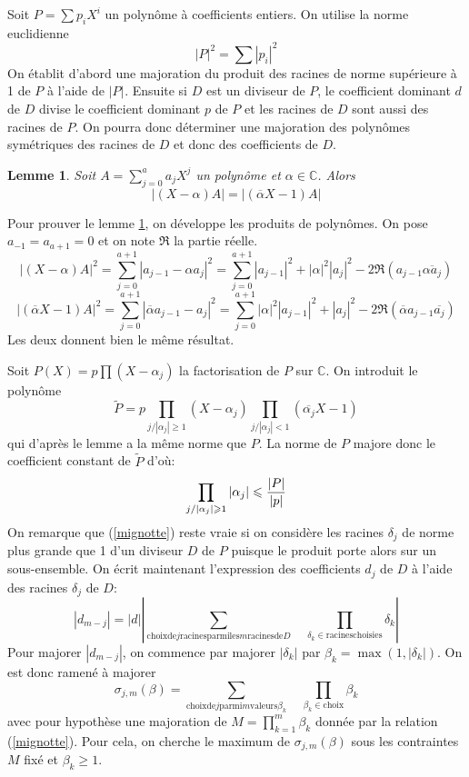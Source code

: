 \documentclass[a4paper,11pt]{article}
\newtheorem{lemma}[thm]{Lemme}
\begin{document}
Soit $P = \sum p_i X^i$ un polynôme à coefficients entiers. On utilise la
norme euclidienne
\begin{equation}
  | P |^2 = \sum | p_i |^2
\end{equation}
On établit d'abord une majoration du produit des racines de norme supérieure à
1 de $P$ à l'aide de $| P |^{}$. Ensuite si $D$ est un diviseur de $P$, le
coefficient dominant $d$ de $D$ divise le coefficient dominant $p$ de $P$ et 
les racines de $D$ sont aussi des racines de $P$. On pourra donc déterminer une
majoration des polynômes symétriques des racines de $D$ et donc des
coefficients de $D$.

\begin{lemma} \label{lemme:A}
  Soit $A = \sum_{j = 0}^a a_j X^j$ un polynôme et $\alpha \in \mathbb{C}$.
  Alors
  \[ \text{$| ( X - \alpha ) A | = | ( \overline{\alpha} X - 1 ) A |$} \]
\end{lemma}

Pour prouver le lemme \ref{lemme:A}, on développe les produits de polynômes. 
On pose $a_{-1} = a_{a + 1} = 0$ et on note $\Re$ la partie réelle.
\[ \text{$| ( X - \alpha ) A |^2 = \sum_{j = 0}^{a + 1}$} | a_{j - 1} - \alpha
   a_j |^2 = \sum_{j = 0}^{a + 1} | a_{j - 1} |^2 + | \alpha |^2 | a_j |^2 - 2
   \Re ( a_{j - 1} \overline{\alpha  a_j} ) \]
\[ \text{$| (  \overline{\alpha} X - 1 ) A |$}^2 = \sum_{j = 0}^{a + 1} | 
\overline{\alpha} a_{j - 1}
   - a_j |^2 = \sum_{j = 0}^{a + 1} | \alpha |^2 | a_{j - 1} |^2 + | a_j |^2 -
   2 \Re ( \overline{\alpha}  a_{j - 1}   \overline{a_j} ) \]
Les deux donnent bien le même résultat.

Soit $P ( X ) = p \prod ( X - \alpha_j )$ la factorisation de $P$ sur
$\mathbb{C}$. On introduit le polynôme
\[ \tilde{P} = p \prod_{j / | \alpha_j | \geqslant 1} ( X - \alpha_j )
   \prod_{j / | \alpha_j | < 1} (  \overline{\alpha_j} X - 1 ) \]
qui d'après le lemme a la même norme que $P$. La norme de $P$ majore donc le
coefficient constant de $\tilde{P} $ d'où:
\begin{equation}
  \label{mignotte} \text{$ \prod_{j / | \alpha_j | \geqslant 1} | \alpha_j |
  \leqslant \frac{| P |}{| p |}$}
\end{equation}
On remarque que (\ref{mignotte}) reste vraie si on considère les
racines $\delta_j$ de norme plus grande que 1 d'un diviseur $D$ de $P$ puisque
le produit porte alors sur un sous-ensemble. On écrit maintenant l'expression
des coefficients $d_j$ de $D$ à l'aide des racines $\delta_j$ de $D$:
\[ | d_{m - j} | = | d | \left| \sum_{\mbox{choix} \mbox{de} j \mbox{racines}
   \mbox{parmi} \mbox{les} m \mbox{racines} \mbox{de} D} \quad  \prod_{\delta_k \in
   \mbox{racines} \mbox{choisies}} \delta_k \right| \]
Pour majorer $| d_{m - j} |$, on commence par majorer $| \delta_k |$ par
$\beta_k = \max ( 1, | \delta_k | )$. On est donc ramené à majorer
\[ \sigma_{j, m} ( \beta ) = \sum_{\mbox{choix} \mbox{de} j \mbox{parmi} m
   \mbox{valeurs} \beta_k} \quad \prod_{\beta_k \in \mbox{choix}} \beta_k  \]
avec pour hypothèse une majoration de $M = \prod_{k = 1}^m \beta_k$ donnée par
la relation (\ref{mignotte}). Pour cela, on cherche le maximum de $\sigma_{j,
m} ( \beta )$ sous les contraintes $M$ fixé et $\beta_k \geqslant 1$.
\end{document}
